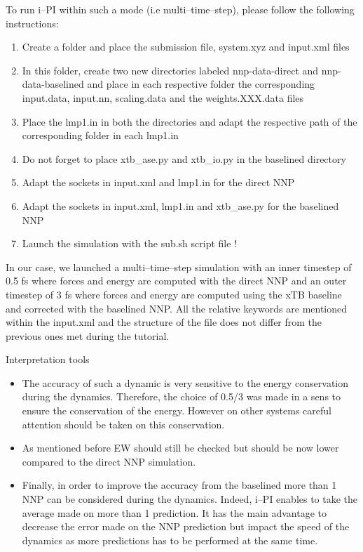 \documentclass[12pt]{article}
\begin{document}
To run i--PI within such a mode (i.e multi--time--step), please follow the following instructions:
\begin{enumerate}
    \item Create a folder and place the submission file, system.xyz and input.xml files
    \item In this folder, create two new directories labeled nnp-data-direct and nnp-data-baselined and place in each respective folder the corresponding input.data, input.nn, scaling.data and the weights.XXX.data files
    \item Place the lmp1.in in both the directories and adapt the respective path of the corresponding folder in each lmp1.in
    \item Do not forget to place xtb\_ase.py and xtb\_io.py in the baselined directory
    \item Adapt the sockets in input.xml and lmp1.in for the direct NNP
    \item Adapt the sockets in input.xml, lmp1.in and xtb\_ase.py for the baselined NNP
    \item Launch the simulation with the sub.sh script file !
\end{enumerate}
In our case, we launched a multi--time--step simulation with an inner timestep of 0.5 fs where forces and energy are computed with the direct NNP and an outer timestep of 3 fs where forces and energy are computed using the xTB baseline and corrected with the baselined NNP. All the relative keywords are mentioned within the input.xml and the structure of the file does not differ from the previous ones met during the tutorial.
\begin{mybox1}{Interpretation tools}
\begin{itemize}
    \item The accuracy of such a dynamic is very sensitive to the energy conservation during the dynamics. Therefore, the choice of 0.5/3 was made in a sens to ensure the conservation of the energy. However on other systems careful attention should be taken on this conservation.
    \item As mentioned before EW should still be checked but should be now lower compared to the direct NNP simulation. 
    \item Finally, in order to improve the accuracy from the baselined more than 1 NNP can be considered during the dynamics. Indeed, i--PI enables to take the average made on more than 1 prediction. It has the main advantage to decrease the error made on the NNP prediction but impact the speed of the dynamics as more predictions has to be performed at the same time.
\end{itemize}
\end{mybox1}
%
%
\newpage
{}
\end{document}
